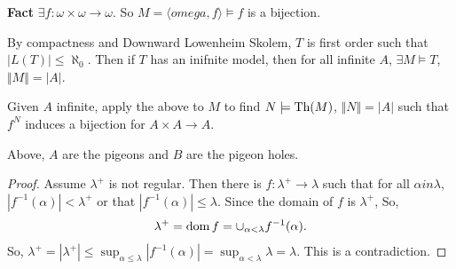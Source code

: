 \documentclass{report}
\begin{document}
\noindent \textbf{Fact} $\exists f: \omega \times \omega \to \omega$. So $M = \langle omega, f \rangle \models f$ is a bijection. 

By compactness and Downward Lowenheim Skolem, $T$ is first order such that $|L(T)| \leq \aleph_0$.  Then if $T$ has an inifnite model, then for all infinite $A$, $\exists M \models T$, $\Vert M \Vert = |A|$. 

Given $A$ infinite, apply the above to $M$ to find $N \models \text{Th}(M)$, $\Vert N \Vert = |A|$ such that $f^N$ induces a bijection for $A \times A \to A$. 

Above, $A$ are the pigeons and $B$ are the pigeon holes. 

\newpage 
{}
\begin{proof}
    Assume $\lambda^+$ is not regular. Then there is $f: \lambda^+ \to \lambda$ such that for all $\alpha in \lambda$, $|f^{-1}(\alpha)| <\lambda^+$ or that $|f^{-1}(\alpha)| \leq \lambda$. Since the domain of $f$ is $\lambda^+$, So,
    \begin{align*}
        \lambda^+ = \operatorname{dom} f = \cup_{\alpha < \lambda}f^{-1}(\alpha).
    \end{align*}
    So, $\lambda^+ = |\lambda^+| \leq \sup_{\alpha \leq \lambda} |f^{-1}(\alpha)| = \sup_{\alpha < \lambda}\lambda = \lambda$. This  is a contradiction.
\end{proof}



\end{document}
